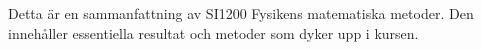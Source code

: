 Detta är en sammanfattning av SI1200 Fysikens matematiska metoder. Den innehåller essentiella resultat och metoder som dyker upp i kursen.